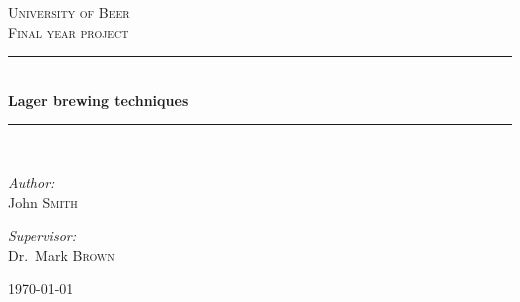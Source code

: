 \newcommand{\HRule}{\rule{\linewidth}{0.5mm}}
\begin{titlepage}

      \begin{center}



      \textsc{\LARGE University of Beer}\\[1.5cm]

      \textsc{\Large Final year project}\\[0.5cm]


      \HRule \\[0.4cm]
      { \huge \bfseries Lager brewing techniques}\\[0.4cm]

      \HRule \\[1.5cm]

      \begin{minipage}{0.4\textwidth}
      \begin{flushleft} \large
      \emph{Author:}\\
      John \textsc{Smith}
      \end{flushleft}
      \end{minipage}
      \begin{minipage}{0.4\textwidth}
      \begin{flushright} \large
      \emph{Supervisor:} \\
      Dr.~Mark \textsc{Brown}
      \end{flushright}
      \end{minipage}

      \vfill

      {\large \today}

      \end{center}

      \end{titlepage}